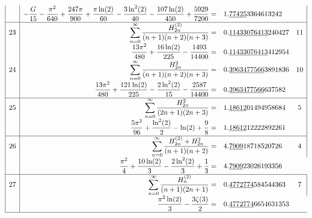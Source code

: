 \documentclass[12pt]{book}
\begin{document}
\begin{CJK}{UTF8}{bsmi}
$$\begin{array}{|l|rlc|}
 & \displaystyle -\frac{G}{15}-\frac{\pi^2}{640}+\frac{247\pi}{900}+\frac{\pi\ln(2)}{60}-\frac{3\ln^2(2)}{40}-\frac{107\ln(2)}{450}+\frac{5929}{7200}= &
1.\underline{77425}3364613242 & \\[5pt]
\hline
23 & \displaystyle \sum_{n=0}^\infty\frac{H_{2n}^{(2)}}{(n+1)(n+2)(n+3)}= &
0.\underline{11433076413}240427 & 11 \\
 & \displaystyle \frac{13\pi^2}{480}+\frac{16\ln(2)}{225}-\frac{1493}{14400}= & 
0.\underline{11433076413}412954 & \\[5pt]
24 & \displaystyle \sum_{n=0}^\infty\frac{H_{2n}^2}{(n+1)(n+2)(n+3)}= &
0.\underline{3963477566}3891836 & 10 \\
 & \displaystyle \frac{13\pi^2}{480}+\frac{121\ln(2)}{225}-\frac{2\ln^2(2)}{15}-\frac{2587}{14400}= & 
0.\underline{3963477566}637582 & \\[5pt]
\hline
25 & \displaystyle \sum_{n=0}^\infty\frac{H_{2n}^2}{(2n+1)(2n+3)}= &
1.\underline{18612}01494958684 & 5 \\
 & \displaystyle \frac{5\pi^2}{96}+\frac{\ln^2(2)}{2}-\ln(2)+\frac{9}{8}= &
1.\underline{18612}12222892261 & \\[5pt]
\hline
26 & \displaystyle \sum_{n=0}^\infty\frac{H_{2n}^{(2)}+H_{2n}^{2}}{(n+1)(n+2)}= &
4.\underline{7909}18718520726 & 4 \\
 & \displaystyle \frac{\pi^2}{4}+\frac{10\ln(2)}{3}-\frac{2\ln^2(2)}{3}+\frac{1}{3}= & 
4.\underline{7909}23026193356 \\[5pt]
\hline
27 & \displaystyle \sum_{n=0}^\infty\frac{H_n^{(2)}}{(n+1)(2n+1)}= &
0.\underline{4772774}584544363 & 7 \\
 & \displaystyle \frac{\pi^2\ln(2)}{3}-\frac{3\zeta(3)}{2}= &
0.\underline{4772774}6654631353 \\[5pt]
\hline
\end{array}$$



\end{CJK}
\end{document}
